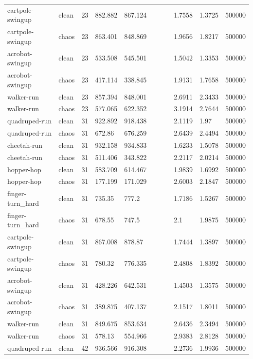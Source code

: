 \begin{tabular}{lllllllllll}
cartpole-swingup & clean & 23 & 882.882 & 867.124 &  &  &  & 1.7558 & 1.3725 & 500000 \\
cartpole-swingup & chaos & 23 & 863.401 & 848.869 &  &  &  & 1.9656 & 1.8217 & 500000 \\
acrobot-swingup & clean & 23 & 533.508 & 545.501 &  &  &  & 1.5042 & 1.3353 & 500000 \\
acrobot-swingup & chaos & 23 & 417.114 & 338.845 &  &  &  & 1.9131 & 1.7658 & 500000 \\
walker-run & clean & 23 & 857.394 & 848.001 &  &  &  & 2.6911 & 2.3433 & 500000 \\
walker-run & chaos & 23 & 577.065 & 622.352 &  &  &  & 3.1914 & 2.7644 & 500000 \\
quadruped-run & clean & 31 & 922.892 & 918.438 &  &  &  & 2.1119 & 1.97 & 500000 \\
quadruped-run & chaos & 31 & 672.86 & 676.259 &  &  &  & 2.6439 & 2.4494 & 500000 \\
cheetah-run & clean & 31 & 932.158 & 934.833 &  &  &  & 1.6233 & 1.5078 & 500000 \\
cheetah-run & chaos & 31 & 511.406 & 343.822 &  &  &  & 2.2117 & 2.0214 & 500000 \\
hopper-hop & clean & 31 & 583.709 & 614.467 &  &  &  & 1.9839 & 1.6992 & 500000 \\
hopper-hop & chaos & 31 & 177.199 & 171.029 &  &  &  & 2.6003 & 2.1847 & 500000 \\
finger-turn\_hard & clean & 31 & 735.35 & 777.2 &  &  &  & 1.7186 & 1.5267 & 500000 \\
finger-turn\_hard & chaos & 31 & 678.55 & 747.5 &  &  &  & 2.1 & 1.9875 & 500000 \\
cartpole-swingup & clean & 31 & 867.008 & 878.87 &  &  &  & 1.7444 & 1.3897 & 500000 \\
cartpole-swingup & chaos & 31 & 780.32 & 776.335 &  &  &  & 2.4808 & 1.8392 & 500000 \\
acrobot-swingup & clean & 31 & 428.226 & 642.531 &  &  &  & 1.4503 & 1.3575 & 500000 \\
acrobot-swingup & chaos & 31 & 389.875 & 407.137 &  &  &  & 2.1517 & 1.8011 & 500000 \\
walker-run & clean & 31 & 849.675 & 853.634 &  &  &  & 2.6436 & 2.3494 & 500000 \\
walker-run & chaos & 31 & 578.13 & 554.966 &  &  &  & 2.9383 & 2.8128 & 500000 \\
quadruped-run & clean & 42 & 936.566 & 916.308 &  &  &  & 2.2736 & 1.9936 & 500000 \\

\end{tabular}
